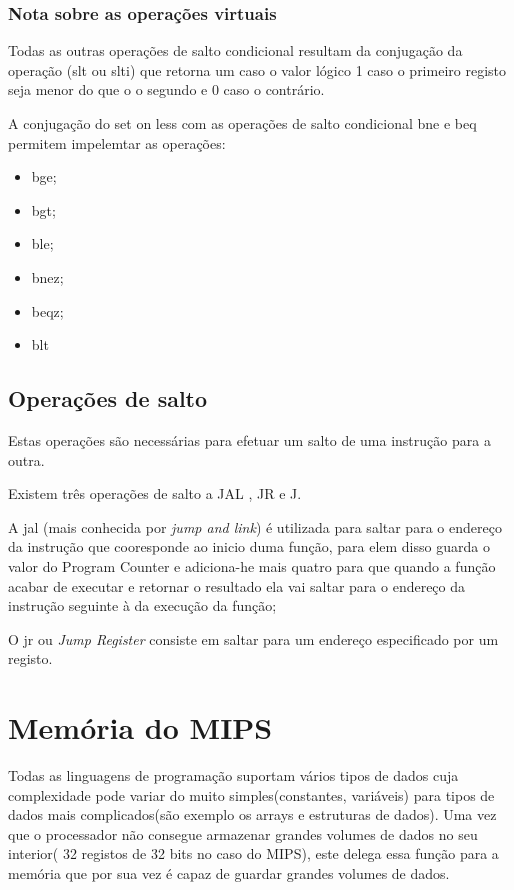 \documentclass[10pt,a4paper]{book}
\begin{document}
     \subsection{Nota sobre as operações virtuais}

	Todas as outras operações de salto condicional resultam da conjugação da operação (slt ou slti) que retorna um caso o valor lógico 1 caso o primeiro registo seja menor do que o o segundo e 0 caso o contrário.

	A conjugação do set on less com as operações de salto condicional bne e beq permitem impelemtar as operações:
	    \begin{itemize}
	     \item bge;
	     \item bgt;
	     \item ble;
	     \item bnez;
	     \item beqz;
	     \item blt
	   \end{itemize}

 	\section{Operações de salto}

 		Estas operações são necessárias para efetuar um salto de uma instrução para a outra.

 		Existem três operações de salto a JAL , JR e J.

 		A jal (mais conhecida por \textit{jump and link}) é utilizada para saltar para o endereço da instrução que cooresponde ao inicio duma função, para elem disso guarda o valor do Program Counter e adiciona-he mais quatro para que quando a função acabar de executar e retornar o resultado ela vai saltar para o endereço da instrução seguinte à da execução da função;

 		O jr ou  \textit{Jump Register}  consiste em saltar para um endereço especificado por um registo.




 \chapter{Memória do MIPS}
    Todas as linguagens de programação suportam vários tipos de dados cuja complexidade pode variar do muito simples(constantes, variáveis) para tipos de dados mais complicados(são exemplo os arrays e estruturas de dados).
    Uma vez que o processador não consegue armazenar grandes volumes de dados no seu interior( 32 registos de 32 bits no caso do MIPS), este delega essa função para a memória que por sua vez é capaz de guardar grandes volumes de dados.
\end{document}
